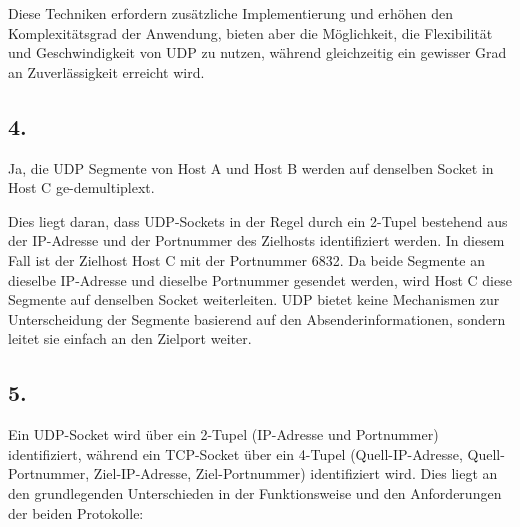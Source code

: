 \documentclass[a4paper]{scrartcl}
\begin{document}
Diese Techniken erfordern zusätzliche Implementierung und erhöhen den Komplexitätsgrad der Anwendung, bieten aber die Möglichkeit, die Flexibilität und Geschwindigkeit von UDP zu nutzen, während gleichzeitig ein gewisser Grad an Zuverlässigkeit erreicht wird.

\subsection*{4.}

Ja, die UDP Segmente von Host A und Host B werden auf denselben Socket in Host C ge-demultiplext. 

Dies liegt daran, dass UDP-Sockets in der Regel durch ein 2-Tupel bestehend aus der IP-Adresse und der Portnummer des Zielhosts identifiziert werden. In diesem Fall ist der Zielhost Host C mit der Portnummer 6832. Da beide Segmente an dieselbe IP-Adresse und dieselbe Portnummer gesendet werden, wird Host C diese Segmente auf denselben Socket weiterleiten. UDP bietet keine Mechanismen zur Unterscheidung der Segmente basierend auf den Absenderinformationen, sondern leitet sie einfach an den Zielport weiter.

\subsection*{5.}

Ein UDP-Socket wird über ein 2-Tupel (IP-Adresse und Portnummer) identifiziert, während ein TCP-Socket über ein 4-Tupel (Quell-IP-Adresse, Quell-Portnummer, Ziel-IP-Adresse, Ziel-Portnummer) identifiziert wird. Dies liegt an den grundlegenden Unterschieden in der Funktionsweise und den Anforderungen der beiden Protokolle:
\end{document}
